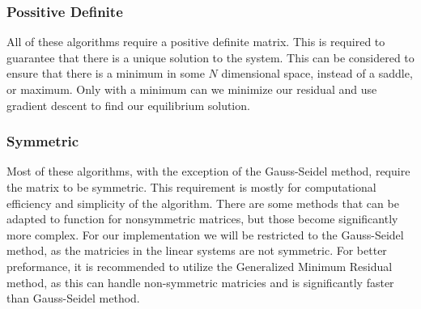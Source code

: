 \documentclass[../fem.tex]{subfile}
\begin{document}
\subsubsection{Possitive Definite}%
\label{ssub:possitive_definite}

All of these algorithms require a positive definite matrix. This is required to
guarantee that there is a unique solution to the system. This can be considered
to ensure that there is a minimum in some $N$ dimensional space, instead of a
saddle, or maximum. Only with a minimum can we minimize our residual and use
gradient descent to find our equilibrium solution.

\subsubsection{Symmetric}%
\label{ssub:symmetric}

Most of these algorithms, with the exception of the Gauss-Seidel method,
require the matrix to be symmetric. This requirement is mostly for
computational efficiency and simplicity of the algorithm. There are some
methods that can be adapted to function for nonsymmetric matrices, but those
become significantly more complex. For our implementation we will be restricted
to the Gauss-Seidel method, as the matricies in the linear systems are not
symmetric. For better preformance, it is recommended to utilize the Generalized
Minimum Residual method, as this can handle non-symmetric matricies and is
significantly faster than Gauss-Seidel method.
\end{document}
